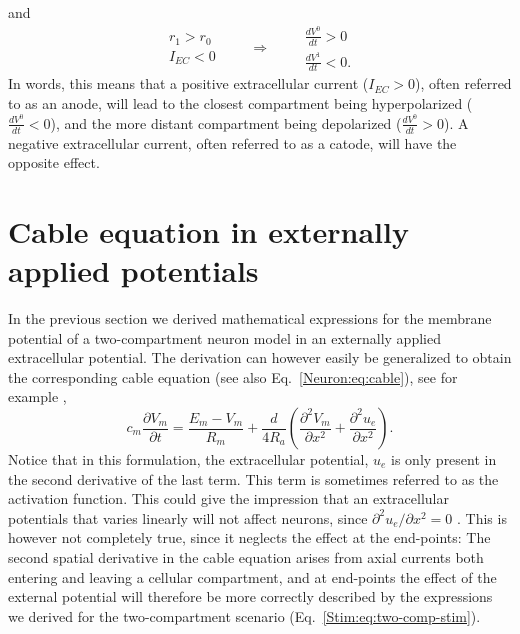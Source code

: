 and 
\begin{equation}
 \begin{aligned}
        r_1>r_0\\
        I_{EC} < 0
       \end{aligned}
 \qquad \Rightarrow \qquad
 \begin{aligned}
        \frac{dV^0}{dt}>0\\
        \frac{dV^1}{dt}<0.
     \end{aligned}
\end{equation}
In words, this means that a positive extracellular current ($I_{EC} > 0$), often referred to as an anode, will lead to the closest compartment being hyperpolarized ($\frac{dV^0}{dt}<0$), and the more distant compartment being depolarized ($\frac{dV^0}{dt}>0$). A negative extracellular current, often referred to as a catode, will have the opposite effect.

\section{Cable equation in externally applied potentials}
In the previous section we derived mathematical expressions for the membrane potential of a two-compartment neuron model in an externally applied extracellular potential. The derivation can however easily be generalized to obtain the corresponding cable equation (see also Eq.~\ref{Neuron:eq:cable}), 
see for example \cite{Tveito2017},
\begin{equation}
c_m \frac{\partial V_m}{\partial t} = \frac{E_m-V_m}{R_m} +  \frac{d}{4 R_a} \left( \frac{\partial^2 V_m}{\partial x^2} +
\frac{\partial^2 u_e}{\partial x^2} \right ).
\end{equation}
Notice that in this formulation, the extracellular potential, $u_e$ is only present in the second derivative of the last term.
This term is sometimes referred to as the activation function.
 This could give the impression that an extracellular potentials that varies linearly will not affect neurons, since $\partial^2 u_e / \partial x^2 = 0$ . This is however not completely true, since it neglects the effect at the end-points:
The second spatial derivative in the cable equation arises from axial currents both entering and leaving a cellular compartment, and at end-points the effect of the external potential will therefore be more correctly described by the expressions we derived for the two-compartment scenario (Eq.~\ref{Stim:eq:two-comp-stim}).

